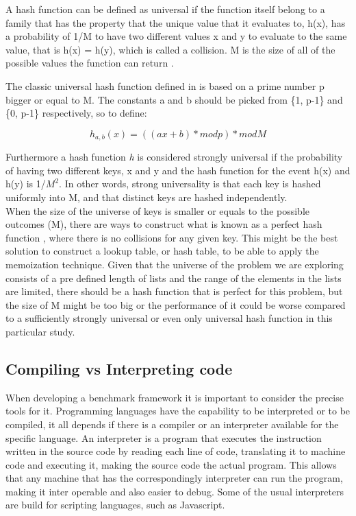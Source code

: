 \documentclass[a4paper,12pt]{article}
\begin{document}
A hash function can be defined as universal if the function itself belong to a family that has the property that the unique value that it evaluates to, h(x), has a probability of 1/M to have two different values x and y to evaluate to the same value, that is h(x) = h(y), which is called a collision. M is the size of all of the possible values the function can return \cite{carter1979universal}.

The classic universal hash function defined in \cite{carter1979universal} is based on a prime number p bigger or equal to M. The constants a and b should be picked from  \{1, p-1\} and  \{0, p-1\} respectively, so to define:

\begin{equation}
    h_{a, b}(x) = ((ax + b)  * mod p) * mod M 
\end{equation}


Furthermore a hash function {\it h} is considered strongly universal if the probability of having two different keys, x and y and the hash function for the event h(x) and h(y) is 1/$M^{2}$. In other words, strong universality is that each key is hashed uniformly into M, and that distinct keys are hashed independently.\\

When the size of the universe of keys is smaller or equals to the possible outcomes (M), there are ways to construct what is known as a perfect hash function  \cite{sprugnoli1977perfect}, where there is no collisions for any given key.  This might be the best solution to construct a lookup table, or hash table, to be able to apply the memoization technique. Given that the universe of the problem we are exploring consists of a pre defined length of lists and the range of the elements in the lists are limited, there should be a hash function that is perfect for this problem, but the size of M might be too big or the performance of it  could be worse compared to a sufficiently strongly universal or even only universal hash function in this particular study.

\subsection{Compiling vs Interpreting code}
When developing a benchmark framework it is important to consider the precise tools for it. Programming languages have the capability to be interpreted or to be compiled, it all depends if there is a compiler or an interpreter available for the specific language. An interpreter is a program that executes the instruction written in the source code by reading each line of code, translating it to machine code and executing it, making the source code the actual program. This allows that any machine that has the correspondingly interpreter can run the program, making it inter operable and also easier to debug. Some of the usual interpreters are build for scripting languages, such as Javascript.
\end{document}
